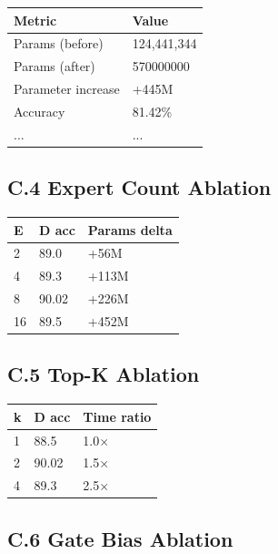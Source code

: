 \begin{table}[H]
\centering
\small
\begin{tabular}{ll}
\toprule
\textbf{Metric} & \textbf{Value} \\
\midrule
Params (before) & 124,441,344 \\
Params (after) & 570000000 \\
Parameter increase & +445M \\
Accuracy & 81.42\% \\
... & ... \\
\bottomrule
\end{tabular}
\end{table}

\subsection{C.4 Expert Count Ablation}

\begin{table}[H]
\centering
\small
\begin{tabular}{lll}
\toprule
\textbf{E} & \textbf{D acc} & \textbf{Params delta} \\
\midrule
2 & 89.0 & +56M \\
4 & 89.3 & +113M \\
8 & 90.02 & +226M \\
16 & 89.5 & +452M \\
\bottomrule
\end{tabular}
\end{table}

\subsection{C.5 Top-K Ablation}

\begin{table}[H]
\centering
\small
\begin{tabular}{lll}
\toprule
\textbf{k} & \textbf{D acc} & \textbf{Time ratio} \\
\midrule
1 & 88.5 & 1.0$\times$ \\
2 & 90.02 & 1.5$\times$ \\
4 & 89.3 & 2.5$\times$ \\
\bottomrule
\end{tabular}
\end{table}

\subsection{C.6 Gate Bias Ablation}

